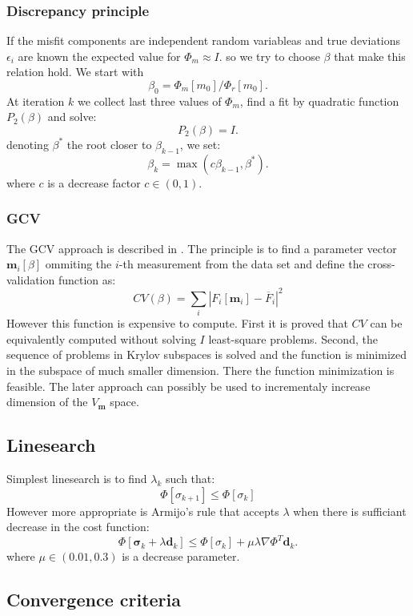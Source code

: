 \documentclass[a4paper, 12pt]{book}
\theoremstyle{definition}
\def\grad{\nabla}
\def\vc#1{\mathbf{\boldsymbol{#1}}}     %
\begin{document}
\subsubsection{Discrepancy principle}
If the misfit components are independent random variableas and true deviations $\epsilon_i$ are known the expected value for $\Phi_m \approx I$.
so we try to choose $\beta$ that make this relation hold. We start with 
\[
  \beta_0 = \Phi_m[m_0]/ \Phi_r[m_0].
\]
At iteration $k$ we collect last three values of $\Phi_m$, find a fit by quadratic function $P_2(\beta)$ and solve:
\[
    P_2(\beta) = I.
\]
denoting $\beta^*$ the root closer to $\beta_{k-1}$, we set:
\[
    \beta_k = \max( c\beta_{k-1}, \beta^*).
\]
where $c$ is a decrease factor $c\in (0,1)$.

\subsubsection{GCV}
The GCV approach is described in \cite{haber_gcv_2000}. The principle is to find a parameter vector $\vc m_i[\beta]$ ommiting
the $i$-th measurement from the data set and define the cross-validation function as:
\[
  CV(\beta) = \sum_i |F_i[\vc m_i] - \overline{F}_i |^2
\]
However this function is expensive to compute. First it is proved that $CV$ can be equivalently computed without solving $I$ least-square problems.
Second, the sequence of problems in Krylov subspaces is solved and the function is minimized in the subspace of much smaller dimension. There the function minimization
is feasible. The later approach can possibly be used to incrementaly increase dimension of the $V_{\vc m}$ space.




\subsection{Linesearch}
\label{sec:linesearch}
Simplest linesearch is to find $\lambda_k$ such that:
\[
    \Phi[\sigma_{k+1}] \le \Phi[\sigma_k]
\]
However more appropriate is Armijo's rule \cite{wiki_backtracking_2017} that accepts $\lambda$ when there is sufficiant 
decrease in the cost function:
\[
    \Phi[\vc \sigma_{k} + \lambda \vc d_k] \le \Phi[\sigma_k] + \mu \lambda \grad \Phi^T \vc d_k.
\]
where $\mu \in (0.01,0.3)$ is a decrease parameter. 


\subsection{Convergence criteria}
\label{sec:conv_crit}
\end{document}
